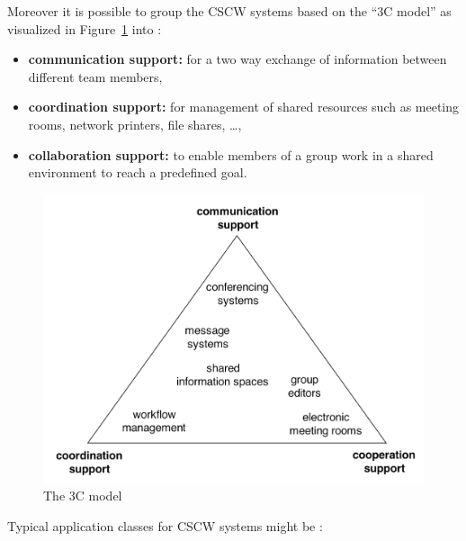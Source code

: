 Moreover it is possible to group the \gls{CSCW} systems based on the ``3C model'' as visualized in Figure~\ref{fig:images_cscw_3C_model} into \citep[pg. 125]{borghoff2000computer}:

\begin{itemize}
  \item \textbf{communication support:} for a two way exchange of information between different team members,
  \item \textbf{coordination support:} for management of shared resources such as meeting rooms, network printers, file shares, \ldots,
  \item \textbf{collaboration support:} to enable members of a group work in a shared environment to reach a predefined goal.
\end{itemize}

\begin{figure}[H]
 \centering
 \includegraphics[width=0.9\columnwidth]{images/3C-model.png}
 \caption[The 3C model]{The 3C model \citep{Koch2008}}
\label{fig:images_cscw_3C_model}
\end{figure}

Typical application classes for \gls{CSCW} systems might be \citep[pg. 119-120]{borghoff2000computer}: \@

